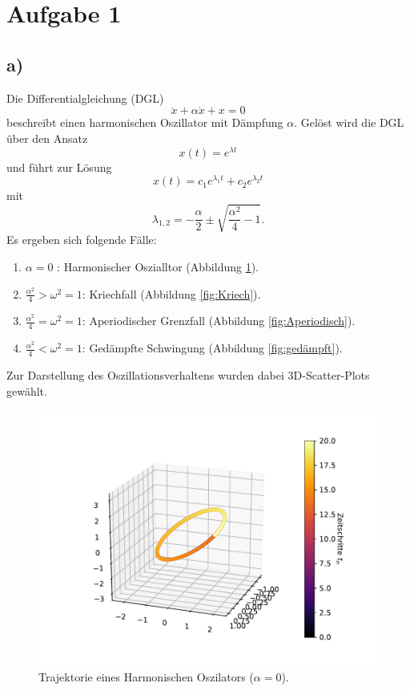 \section*{Aufgabe 1}
\subsection*{a)}
Die Differentialgleichung (DGL) 
\begin{equation}
    \ddot{x} + \alpha \dot{x} + x = 0
\end{equation}
beschreibt einen harmonischen Oszillator mit Dämpfung $\alpha$.
Gelöst wird die DGL über den Ansatz 
\begin{equation}
    x(t) = e^{\lambda t}
\end{equation}
und führt zur Lösung 
\begin{equation}
    x(t) = c_1 e^{\lambda_1 t} + c_2 e^{\lambda_2 t}
\end{equation}
mit 
\begin{equation}
    \lambda_{1,2} = - \frac{\alpha}{2} \pm \sqrt{ \frac{\alpha^2}{4} -1 }.
\end{equation}
Es ergeben sich folgende Fälle:
\begin{enumerate}
    \item $\alpha = 0$ : Harmonischer Oszialltor (Abbildung \ref{fig:harmonisch}).
    \item $\frac{\alpha^2}{4} > \omega^2 = 1$: Kriechfall (Abbildung \ref{fig:Kriech}).
    \item $\frac{\alpha^2}{4} = \omega^2 = 1$: Aperiodischer Grenzfall (Abbildung \ref{fig:Aperiodisch}).
    \item $\frac{\alpha^2}{4} < \omega^2 = 1$: Gedämpfte Schwingung (Abbildung \ref{fig:gedämpft}).
\end{enumerate}
Zur Darstellung des Oszillationsverhaltens wurden dabei 3D-Scatter-Plots gewählt.
\begin{figure}
  \centering
  \includegraphics[scale=0.7]{A2/build/Plots/aufg1_a1.pdf}
  \caption{Trajektorie eines Harmonischen Oszilators ($\alpha = 0$).}
  \label{fig:harmonisch}
\end{figure}


